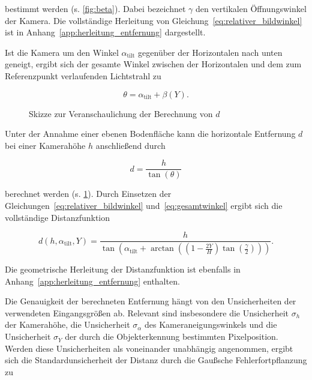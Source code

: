 bestimmt werden (s. \cref{fig:beta}). Dabei bezeichnet \(\gamma\) den vertikalen Öffnungswinkel der Kamera. Die vollständige Herleitung von Gleichung~\ref{eq:relativer_bildwinkel} ist in Anhang~\ref{app:herleitung_entfernung} dargestellt. 

Ist die Kamera um den Winkel \(\alpha_{\mathrm{tilt}}\) gegenüber der Horizontalen nach unten geneigt, ergibt sich der gesamte Winkel zwischen der Horizontalen und dem zum Referenzpunkt verlaufenden Lichtstrahl zu 

\begin{equation} 
    \theta = \alpha_{\mathrm{tilt}} + \beta(Y). 
    \label{eq:gesamtwinkel} 
\end{equation} 

\begin{figure}[ht]
    \centering
    
        \caption[Skizze zur Veranschaulichung der Berechnung von $d$]{Skizze zur Veranschaulichung der Berechnung von $d$}
    \label{fig:d}
\end{figure}

Unter der Annahme einer ebenen Bodenfläche kann die horizontale Entfernung \(d\) bei einer Kamerahöhe \(h\) anschließend durch 

\begin{equation} 
    d = \frac{h}{\tan(\theta)} 
    \label{eq:entfernung_theta} 
\end{equation} 

berechnet werden (s. \cref{fig:d}). Durch Einsetzen der Gleichungen~\ref{eq:relativer_bildwinkel} und~\ref{eq:gesamtwinkel} ergibt sich die vollständige Distanzfunktion 

\begin{equation} 
    d(h,\alpha_{\mathrm{tilt}},Y) = \frac{h}{ \tan\left( \alpha_{\mathrm{tilt}} + \arctan\left( \left(1-\frac{2Y}{H}\right) \tan\left(\frac{\gamma}{2}\right) \right) \right) }. 
    \label{eq:distanzfunktion} 
\end{equation} 

Die geometrische Herleitung der Distanzfunktion ist ebenfalls in Anhang~\ref{app:herleitung_entfernung} enthalten. 

Die Genauigkeit der berechneten Entfernung hängt von den Unsicherheiten der verwendeten Eingangsgrößen ab. Relevant sind insbesondere die Unsicherheit \(\sigma_h\) der Kamerahöhe, die Unsicherheit \(\sigma_{\alpha}\) des Kameraneigungswinkels und die Unsicherheit \(\sigma_Y\) 
der durch die Objekterkennung bestimmten Pixelposition. Werden diese Unsicherheiten als voneinander unabhängig angenommen, ergibt sich die Standardunsicherheit der Distanz durch die Gaußsche Fehlerfortpflanzung zu 


